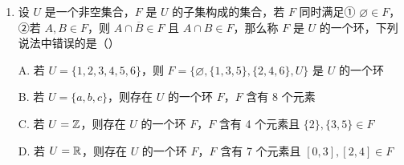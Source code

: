 \documentclass[a4paper,11pt]{article}
\begin{document}
\begin{enumerate}
\item 设 $U$ 是一个非空集合，$F$ 是 $U$ 的子集构成的集合，若 $F$ 同时满足① $\varnothing\in F$，②若 $A,B\in F$，则 $A\cap\overline{B}\in F$ 且 $A\cap B\in F$，那么称 $F$ 是 $U$ 的一个环，下列说法中错误的是\mbox{（\quad）}

\keepwithprev
A. 若 $U=\{1,2,3,4,5,6\}$，则 $F=\{\varnothing,\{1,3,5\},\{2,4,6\},U\}$ 是 $U$ 的一个环

B. 若 $U=\{a,b,c\}$，则存在 $U$ 的一个环 $F$，$F$ 含有 8 个元素

C. 若 $U=\mathbb{Z}$，则存在 $U$ 的一个环 $F$，$F$ 含有 4 个元素且 $\{2\},\{3,5\}\in F$

D. 若 $U=\mathbb{R}$，则存在 $U$ 的一个环 $F$，$F$ 含有 7 个元素且 $[0,3],[2,4]\in F$

\ifanswer
\solbegin
{}
\solend
\fi

\end{enumerate}

\end{document}
